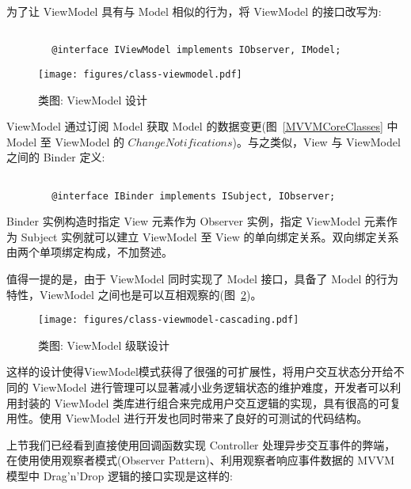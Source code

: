 为了让 ViewModel 具有与 Model 相似的行为，将 ViewModel 的接口改写为:

\begin{verbatim}

        @interface IViewModel implements IObserver, IModel;

\end{verbatim}

\begin{figure}[!h]
  \begin{center}
    \texttt{[image: figures/class-viewmodel.pdf]}
    \caption{类图: ViewModel 设计\label{ViewModelClass}}
  \end{center}
\end{figure}

ViewModel 通过订阅 Model 获取 Model 的数据变更(图~\ref{MVVMCoreClasses} 中 Model 至 ViewModel 的 $Change Notifications$)。与之类似，View 与 ViewModel 之间的 Binder 定义:

\begin{verbatim}

        @interface IBinder implements ISubject, IObserver;

\end{verbatim}

Binder 实例构造时指定 View 元素作为 Observer 实例，指定 ViewModel 元素作为 Subject 实例就可以建立 ViewModel 至 View 的单向绑定关系。双向绑定关系由两个单项绑定构成，不加赘述。

值得一提的是，由于 ViewModel 同时实现了 Model 接口，具备了 Model 的行为特性，ViewModel 之间也是可以互相观察的(图~\ref{ViewModelCascading})。

\begin{figure}[!h]
  \begin{center}
    \texttt{[image: figures/class-viewmodel-cascading.pdf]}
    \caption{类图: ViewModel 级联设计\label{ViewModelCascading}}
  \end{center}
\end{figure}

这样的设计使得ViewModel模式获得了很强的可扩展性，将用户交互状态分开给不同的 ViewModel 进行管理可以显著减小业务逻辑状态的维护难度，开发者可以利用封装的 ViewModel 类库进行组合来完成用户交互逻辑的实现，具有很高的可复用性。使用 ViewModel 进行开发也同时带来了良好的可测试的代码结构。

上节我们已经看到直接使用回调函数实现 Controller 处理异步交互事件的弊端，在使用使用观察者模式(Observer Pattern)、利用观察者响应事件数据的 MVVM 模型中 Drag'n'Drop 逻辑的接口实现是这样的:

